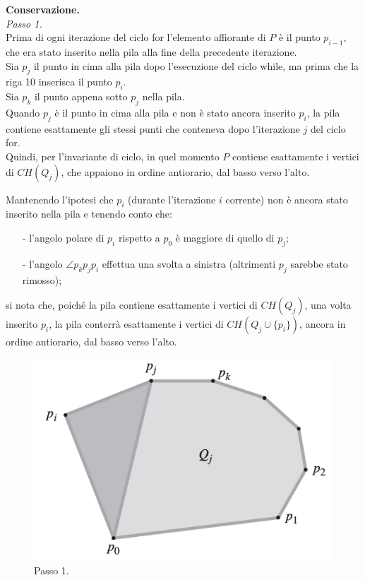 \documentclass[12pt,a4paper]{report}
\begin{document}
\pagebreak

\noindent \textbf{Conservazione.}\\
\textit{Passo 1.}\\
Prima di ogni iterazione del ciclo for l'elemento affiorante di $P$ è il punto $p_{i-1}$, che era stato inserito nella pila alla fine della precedente iterazione.\\
Sia $p_j$ il punto in cima alla pila dopo l'esecuzione del ciclo while, ma prima che la riga 10 inserisca il punto $p_i$.\\
Sia $p_k$ il punto appena sotto $p_j$ nella pila.\\
Quando $p_j$ è il punto in cima alla pila e non è stato ancora inserito $p_i$, la pila contiene esattamente gli stessi punti che conteneva dopo l'iterazione $j$ del ciclo for.\\
Quindi, per l'invariante di ciclo, in quel momento $P$ contiene esattamente i vertici di $CH(Q_j)$, che appaiono in ordine antiorario, dal basso verso l'alto.

\vspace{0.3cm}


\noindent Mantenendo l'ipotesi che $p_i$ (durante l'iterazione $i$ corrente) non è ancora stato inserito nella pila e tenendo conto che:
\begin{itemize}
    \item[-] l'angolo polare di $p_i$ rispetto a $p_0$ è maggiore di quello di $p_j$;
    \item[-] l'angolo $\angle p_kp_jp_i$ effettua una svolta a sinistra (altrimenti $p_j$ sarebbe stato rimosso);
\end{itemize}
si nota che, poiché la pila contiene esattamente i vertici di $CH(Q_j)$, una volta inserito $p_i$, la pila conterrà esattamente i vertici di $CH(Q_j \cup \{p_i\})$, ancora in ordine antiorario, dal basso verso l'alto.

\begin{figure}[ht]
    \centering
    \includegraphics[width=0.55\linewidth]{dimStep1.png}
    \caption{Passo 1.}
    \label{fig:dimStep1}
\end{figure}
\end{document}
